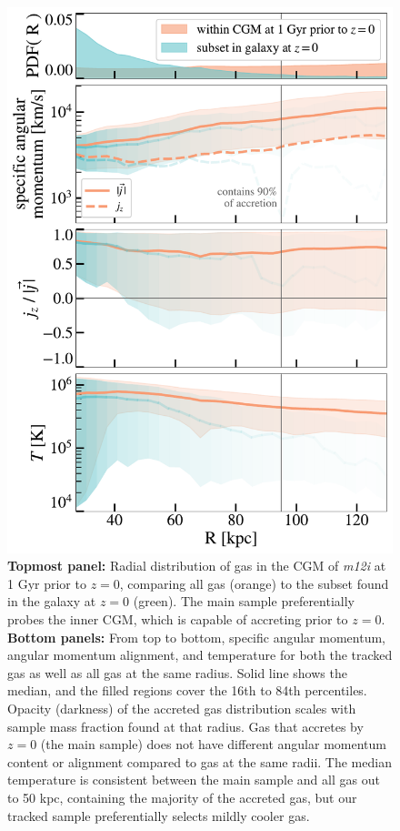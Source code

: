 \documentclass[fleqn,usenatbib]{mnras}
\begin{document}
\begin{figure}
    \centering
    \includegraphics[width=\columnwidth]{figures/selected_to_all_comparison/selected_to_all_comparison_m12i_md.pdf}
    \caption{
    \textbf{Topmost panel:}
    Radial distribution of gas in the CGM of \textit{m12i} at 1 Gyr prior to $z=0$, comparing all gas (orange) to the subset found in the galaxy at $z=0$ (green).
    The main sample preferentially probes the inner CGM, which is capable of accreting prior to $z=0$.
    \textbf{Bottom panels:}
    From top to bottom, specific angular momentum, angular momentum alignment, and temperature for both the tracked gas as well as all gas at the same radius.
    Solid line shows the median, and the filled regions cover the 16th to 84th percentiles.
    Opacity (darkness) of the accreted gas distribution scales with sample mass fraction found at that radius.
    Gas that accretes by $z=0$ (the main sample) does not have different angular momentum content or alignment compared to gas at the same radii.
    The median temperature is consistent between the main sample and all gas out to 50 kpc, containing the majority of the accreted gas, but our tracked sample preferentially selects mildly cooler gas.
    }
    \label{f: sample validation -- spatial}
\end{figure}
\end{document}
